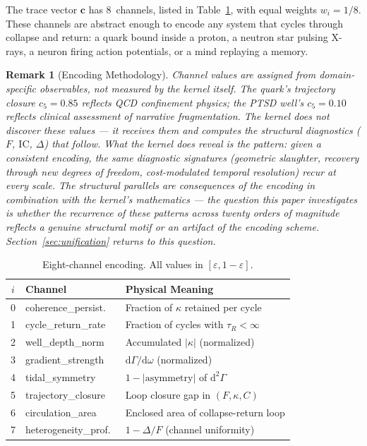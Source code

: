 \documentclass[
  aps,
  prd,
  twocolumn,
  superscriptaddress,
  nofootinbib,
  floatfix
]{revtex4-2}
\newtheorem{remark}{Remark}
\newcommand{\Gam}{\Gamma}
\newcommand{\eps}{\varepsilon}
\newcommand{\dd}{\mathrm{d}}
\newcommand{\tvec}{\mathbf{c}}
\newcommand{\IC}{\mathrm{IC}}
\begin{document}
The trace vector $\tvec$ has 8~channels, listed in
Table~\ref{tab:channels}, with equal weights $w_i = 1/8$.
These channels are abstract enough to encode any system
that cycles through collapse and return: a quark bound inside
a proton, a neutron star pulsing X-rays, a neuron firing
action potentials, or a mind replaying a memory.

\begin{remark}[Encoding Methodology]
\label{rem:encoding}
Channel values are assigned from domain-specific observables,
not measured by the kernel itself.  The quark's trajectory
closure $c_5 = 0.85$ reflects QCD confinement physics; the
PTSD well's $c_5 = 0.10$ reflects clinical assessment of
narrative fragmentation.  The kernel does not discover these
values --- it receives them and computes the structural
diagnostics ($F$, $\IC$, $\Delta$) that follow.  What the
kernel \emph{does} reveal is the \emph{pattern}: given a
consistent encoding, the same diagnostic signatures
(geometric slaughter, recovery through new degrees of
freedom, cost-modulated temporal resolution) recur at every
scale.  The structural parallels are consequences of the
encoding in combination with the kernel's mathematics ---
the question this paper investigates is whether the
recurrence of these patterns across twenty orders of
magnitude reflects a genuine structural motif or an artifact
of the encoding scheme.  Section~\ref{sec:unification}
returns to this question.
\end{remark}

\begin{table}[htbp]
\caption{\label{tab:channels}Eight-channel encoding.  All
values in $[\eps, 1{-}\eps]$.}
\begin{ruledtabular}
\begin{tabular}{clp{3.7cm}}
$i$ & Channel & Physical Meaning \\
\hline
0 & coherence\_persist.\ & Fraction of $\kappa$ retained per cycle \\
1 & cycle\_return\_rate & Fraction of cycles with $\tau_R < \infty$ \\
2 & well\_depth\_norm & Accumulated $|\kappa|$ (normalized) \\
3 & gradient\_strength & $\dd\Gam/\dd\omega$ (normalized) \\
4 & tidal\_symmetry & $1 - |\text{asymmetry}|$ of $\dd^2\Gam$ \\
5 & trajectory\_closure & Loop closure gap in $(F,\kappa,C)$ \\
6 & circulation\_area & Enclosed area of collapse-return loop \\
7 & heterogeneity\_prof.\ & $1 - \Delta/F$ (channel uniformity) \\
\end{tabular}
\end{ruledtabular}
\end{table}
\end{document}
